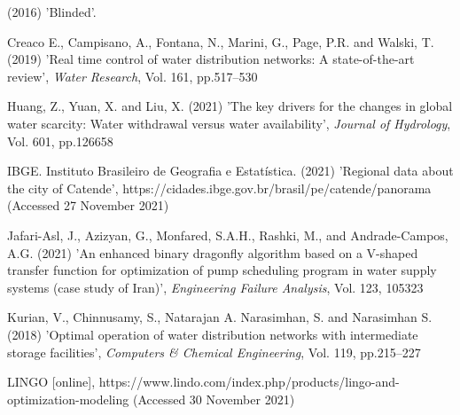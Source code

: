 \documentclass{singlecol}
\theoremstyle{TH}{
\newtheorem{lemma}{Lemma}
\newtheorem{theorem}[lemma]{Theorem}
\newtheorem{corrolary}[lemma]{Corrolary}
\newtheorem{conjecture}[lemma]{Conjecture}
\newtheorem{proposition}[lemma]{Proposition}
\newtheorem{claim}[lemma]{Claim}
\newtheorem{stheorem}[lemma]{Wrong Theorem}
\newtheorem{algorithm}{Algorithm}
}
\theoremstyle{THrm}{
\newtheorem{definition}{Definition}[section]
\newtheorem{question}{Question}[section]
\newtheorem{remark}{Remark}
\newtheorem{scheme}{Scheme}
}
\theoremstyle{THhit}{
\newtheorem{case}{Case}[section]
}
\begin{document}

%
%
%

\begin{thebibliography}{10}

(2016) 'Blinded'.


Creaco E., Campisano, A., Fontana, N.,  Marini, G., Page, P.R. and Walski, T. (2019) 'Real time control of water distribution networks: A state-of-the-art
review', {\it Water Research}, Vol. 161, pp.517--530

Huang, Z., Yuan, X. and  Liu, X. (2021) 'The key drivers for the changes in global water scarcity: Water withdrawal versus water availability', {\it Journal of Hydrology}, Vol. 601, pp.126658

IBGE. Instituto Brasileiro de Geografia e Estatística. (2021) 'Regional data about the city of Catende',
https://cidades.ibge.gov.br/brasil/pe/catende/panorama (Accessed 27 November 2021)

Jafari-Asl, J., Azizyan, G., Monfared, S.A.H., Rashki, M., and Andrade-Campos, A.G. (2021) 'An enhanced binary dragonfly algorithm based on a V-shaped
transfer function for optimization of pump scheduling program in water supply systems (case study of Iran)', {\it Engineering Failure Analysis}, Vol. 123, 105323

Kurian, V., Chinnusamy, S., Natarajan A. Narasimhan, S. and Narasimhan S. (2018) 'Optimal operation of water distribution networks with intermediate storage facilities', {\it Computers \& Chemical Engineering}, Vol. 119, pp.215--227

LINGO [online], https://www.lindo.com/index.php/products/lingo-and-optimization-modeling (Accessed 30 November 2021)


\end{thebibliography}
\end{document}
